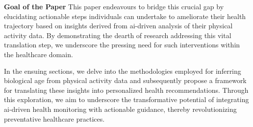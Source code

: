 \textbf{Goal of the Paper} This paper endeavours to bridge this crucial gap by elucidating actionable steps individuals can undertake to ameliorate their health trajectory based on insights derived from \acrshort{ai}-driven analysis of their physical activity data. By demonstrating the dearth of research addressing this vital translation step, we underscore the pressing need for such interventions within the healthcare domain.

In the ensuing sections, we delve into the methodologies employed for inferring biological age from physical activity data and subsequently propose a framework for translating these insights into personalized health recommendations. Through this exploration, we aim to underscore the transformative potential of integrating \acrshort{ai}-driven health monitoring with actionable guidance, thereby revolutionizing preventative healthcare practices.
